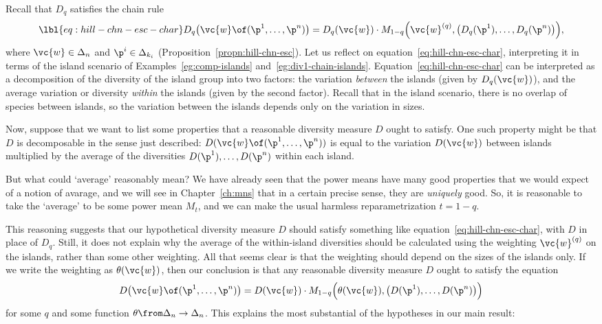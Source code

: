 Recall that $D_q$ satisfies the chain rule
% 
\begin{equation}
\lbl{eq:hill-chn-esc-char}
D_q \bigl( \vc{w} \of (\p^1, \ldots, \p^n) \bigr)
=
D_q(\vc{w}) \cdot
M_{1 - q} \Bigl(
\vc{w}^{(q)}, \bigl(D_q(\p^1), \ldots, D_q(\p^n)\bigr)
\Bigr),
\end{equation}
% 
where $\vc{w} \in \Delta_n$ and $\p^i \in \Delta_{k_i}$
(Proposition~\ref{propn:hill-chn-esc}).
% 
Let us reflect on equation~\eqref{eq:hill-chn-esc-char}, interpreting it in
terms of the island%
%
% 
scenario of Examples~\ref{eg:comp-islands} and~\ref{eg:div1-chain-islands}.
Equation~\eqref{eq:hill-chn-esc-char} can be interpreted as a decomposition
of the diversity of the island group into two factors: the variation
\emph{between} the islands (given by $D_q(\vc{w})$), and the average
variation or diversity \emph{within} the islands (given by the second
factor).  Recall that in the island scenario, there is no overlap of
species between islands, so the variation between the islands depends only
on the variation in sizes.

Now, suppose that we want to list some properties that a reasonable
diversity measure $D$ ought to satisfy.  One such property might be that
$D$ is decomposable in the sense just described: $D(\vc{w} \of (\p^1,
\ldots, \p^n))$ is equal to the variation $D(\vc{w})$ between islands
multiplied by the average of the diversities $D(\p^1), \ldots, D(\p^n)$
within each island.

But what could `average' reasonably mean?  We have already seen that the
power means have many good properties that we would expect of a notion of
avarage, and we will see in Chapter~\ref{ch:mns} that in a certain precise
sense, they are \emph{uniquely} good.  So, it is reasonable to take the
`average' to be some power mean $M_t$, and we can make the usual harmless
reparametrization $t = 1 - q$.

This reasoning suggests that our hypothetical diversity measure $D$ should
satisfy something like equation~\eqref{eq:hill-chn-esc-char}, with $D$ in
place of $D_q$.  Still, it does not explain why the average of the
within-island diversities should be calculated using the weighting
$\vc{w}^{(q)}$ on the islands, 
rather than some other weighting.  All that seems
clear is that the weighting should depend on the sizes of the islands only.
If we write the weighting as $\theta(\vc{w})$, then our conclusion is that
any reasonable diversity measure $D$ ought to satisfy the equation
\[
D \bigl( \vc{w} \of (\p^1, \ldots, \p^n) \bigr)
=
D(\vc{w}) \cdot
M_{1 - q} \Bigl(
\theta(\vc{w}), \bigl(D(\p^1), \ldots, D(\p^n)\bigr)
\Bigr)
\]
for some $q$ and some function $\theta \from \Delta_n \to \Delta_n$.  This
explains the most substantial of the hypotheses in our main result:

